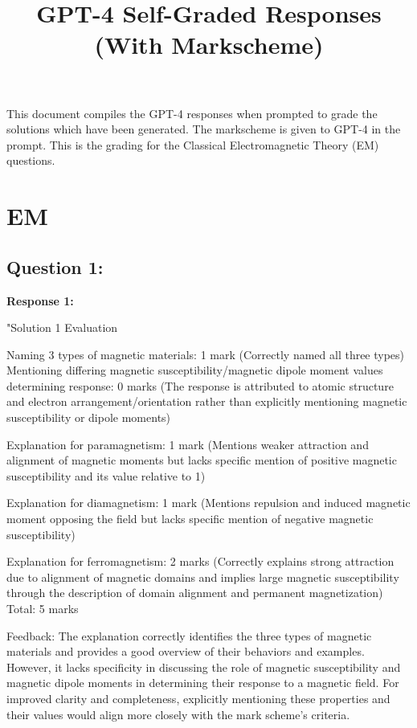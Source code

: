 \documentclass[a4paper,11pt]{article}
\begin{document}
\title{GPT-4 Self-Graded Responses (With Markscheme)}
\maketitle

This document compiles the GPT-4 responses when prompted to grade the solutions which have been generated. The markscheme is given to GPT-4 in the prompt. This is the grading for the Classical Electromagnetic Theory (EM) questions. 

\section{EM}

\subsection*{Question 1:}

\textbf{Response 1:}

"Solution 1 Evaluation

Naming 3 types of magnetic materials: 1 mark (Correctly named all three types)
Mentioning differing magnetic susceptibility/magnetic dipole moment values determining response: 0 marks (The response is attributed to atomic structure and electron arrangement/orientation rather than explicitly mentioning magnetic susceptibility or dipole moments)

Explanation for paramagnetism: 1 mark (Mentions weaker attraction and alignment of magnetic moments but lacks specific mention of positive magnetic susceptibility and its value relative to 1)

Explanation for diamagnetism: 1 mark (Mentions repulsion and induced magnetic moment opposing the field but lacks specific mention of negative magnetic susceptibility)

Explanation for ferromagnetism: 2 marks (Correctly explains strong attraction due to alignment of magnetic domains and implies large magnetic susceptibility through the description of domain alignment and permanent magnetization)
Total: 5 marks

Feedback: The explanation correctly identifies the three types of magnetic materials and provides a good overview of their behaviors and examples. However, it lacks specificity in discussing the role of magnetic susceptibility and magnetic dipole moments in determining their response to a magnetic field. For improved clarity and completeness, explicitly mentioning these properties and their values would align more closely with the mark scheme's criteria.
\end{document}
